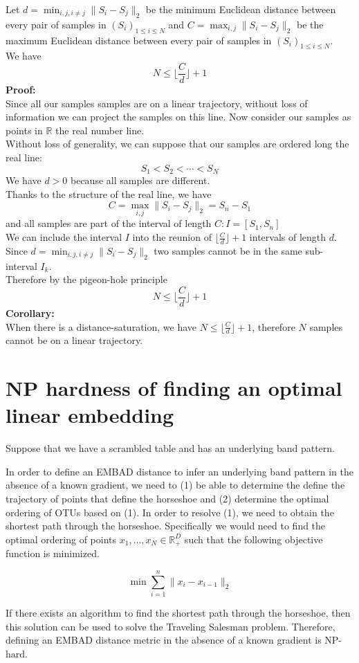  Let $d=\min_{i, j, i \neq j} \lVert S_i - S_j \rVert_2$ be the minimum Euclidean distance between every pair of samples in $(S_i)_{1 \leq i \leq N}$ and $C=\max_{i, j} \lVert S_i - S_j \rVert_2$ be the maximum Euclidean distance between every pair of samples in $(S_i)_{1 \leq i \leq N}$.\\
 We have
 \[ N \leq \bigg\lfloor \frac{C}{d} \bigg\rfloor +1\]
 \textbf{Proof:}\\
 Since all our samples samples are on a linear trajectory, without loss of information we can
 project the samples on this line.  Now consider our samples as points in $\mathbb{R}$ the
 real number line. \\[5 mm]
 Without loss of generality, we can suppose that our samples are ordered long the real line:
 \[S_1<S_2<\cdots<S_N\]
 We have $d>0$ because all samples are different.\\
 Thanks to the structure of the real line, we have
 \[C=\max_{i, j} \lVert S_i - S_j \rVert_2 = S_n-S_1\]
 and all samples are part of the interval of length $C:I=[S_1,S_n ]$\\
 We can include the interval $I$ into the reunion of $\lfloor \frac{C}{d} \rfloor +1$ intervals of length $d$.\\
 Since $d=\min_{i, j, i \neq j} \lVert S_i - S_j \rVert_2$ two samples cannot be in the same
 sub-interval $I_k$. \\
 Therefore by the pigeon-hole principle\\
 \[ N \leq \bigg\lfloor \frac{C}{d} \bigg\rfloor +1\]
 \textbf{Corollary:}\\
 When there is a distance-saturation, we have $N \leq \bigg\lfloor \frac{C}{d} \bigg\rfloor +1$, therefore $N$ samples cannot be on a linear trajectory.

\section{NP hardness of finding an optimal linear embedding}
Suppose that we have a scrambled table and has an underlying band pattern.

In order to define an EMBAD distance to infer an underlying band pattern in the absence of a known gradient, we need to (1) be able to determine the define the trajectory of points that define the horseshoe and (2) determine the optimal ordering of OTUs based on (1). In order to resolve (1), we need to obtain the shortest path through the horseshoe.  Specifically we would need to find the optimal ordering of points $x_1, \ldots ,x_N \in \mathbb{R}^D_+$ such that the following objective function is minimized.

\[ \min \sum\limits_{i=1}^n \lVert x_i - x_{i-1} \rVert_2 \]

If there exists an algorithm to find the shortest path through the horseshoe, then this solution can be used to solve the Traveling Salesman problem.  Therefore, defining an EMBAD distance metric in the absence of a known gradient is NP-hard.
